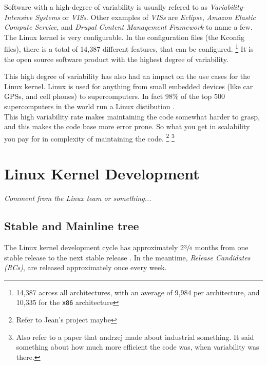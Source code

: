\documentclass[a4paper,11pt]{report}
\begin{document}
Software with a high-degree of variability is usually refered to as 
\emph{Variability-Intensive Systems} or \emph{VISs}. Other examples of 
\emph{VISs} are \emph{Eclipse}, \emph{Amazon Elastic Compute Service}, and 
\emph{Drupal Content Management Framework} 
    \cite[p. 1]{VarTesDrupal}
to name a few.
\\

The Linux kernel is very configurable. In the configuration files (the Kconfig 
files), there is a total of 14,387 different features, that can be configured.
    \footnote {14,387 across all architectures, with an average of 9,984 per 
        architecture, and 10,335 for the \texttt{x86} architecture}
It is the open source software product with the highest degree of variability.

This high degree of variability has also had an impact on the use cases for the 
Linux kernel. Linux is used for anything from small embedded devices (like car 
GPSs, and cell phones) to supercomputers.
In fact 98\% of the top 500 supercomputers in the world run a Linux distibution
    \cite{top500}
.
\\

This high variability rate makes maintaining the code somewhat harder to 
grasp, and this makes the code base more error prone. So what you get in 
scalability you pay for in complexity of maintaining the code. 
    \footnote{Refer to Jean's project maybe}
    \footnote{Also refer to a paper that andrzej made about industrial 
        something. It said something about how much more efficient the code was,
        when variability was there.}


        \section{Linux Kernel Development}

\begin{center}
    \emph{
        Comment from the Linux team or something...
    }
\end{center}


        \subsection*{Stable and Mainline tree}

The Linux kernel development cycle has approximately 2$\sfrac{3}{4}$ months 
from one stable release to the next stable release
    \cite{crystalball}
.
In the meantime, \emph{Release Candidates (RCs)}, are released approximately 
once every week.
\end{document}
